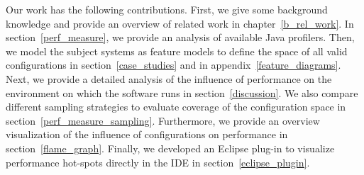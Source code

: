 
Our work has the following contributions.
First, we give some background knowledge and provide an overview of related work in chapter~\ref{b_rel_work}.
In section~\ref{perf_measure}, we provide an analysis of available Java profilers.
Then, we model the subject systems as feature models to define the space of all valid configurations in section~\ref{case_studies} and in appendix~\ref{feature_diagrams}. 
Next, we provide a detailed analysis of the influence of performance on the environment on which the software runs in section~\ref{discussion}. 
We also compare different sampling strategies to evaluate coverage of the configuration space in section~\ref{perf_measure_sampling}. 
Furthermore, we provide an overview visualization of the influence of configurations on performance in section~\ref{flame_graph}. 
Finally, we developed an Eclipse plug-in to visualize performance hot-spots directly in the \ac{IDE} in section~\ref{eclipse_plugin}.

